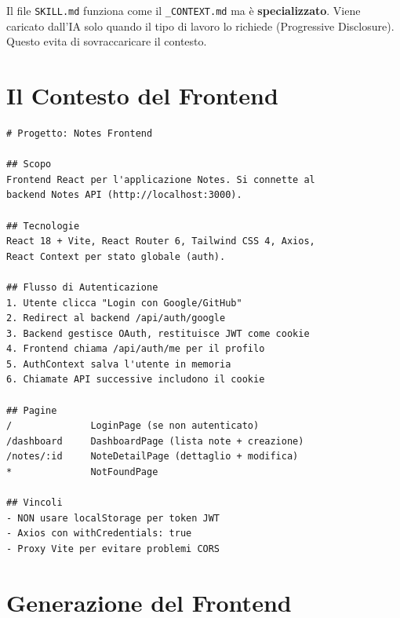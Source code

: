 \begin{notebox}
Il file \texttt{SKILL.md} funziona come il \texttt{\_CONTEXT.md} ma è \textbf{specializzato}. Viene caricato dall'IA solo quando il tipo di lavoro lo richiede (Progressive Disclosure). Questo evita di sovraccaricare il contesto.
\end{notebox}

\section{Il Contesto del Frontend}

\begin{praticabox}[title={Pratica --- Crea \texttt{\_CONTEXT.md} nel frontend}]
\end{praticabox}

\begin{lstlisting}[language={},title={\texttt{\_CONTEXT.md} per Notes Frontend}]
# Progetto: Notes Frontend

## Scopo
Frontend React per l'applicazione Notes. Si connette al
backend Notes API (http://localhost:3000).

## Tecnologie
React 18 + Vite, React Router 6, Tailwind CSS 4, Axios,
React Context per stato globale (auth).

## Flusso di Autenticazione
1. Utente clicca "Login con Google/GitHub"
2. Redirect al backend /api/auth/google
3. Backend gestisce OAuth, restituisce JWT come cookie
4. Frontend chiama /api/auth/me per il profilo
5. AuthContext salva l'utente in memoria
6. Chiamate API successive includono il cookie

## Pagine
/              LoginPage (se non autenticato)
/dashboard     DashboardPage (lista note + creazione)
/notes/:id     NoteDetailPage (dettaglio + modifica)
*              NotFoundPage

## Vincoli
- NON usare localStorage per token JWT
- Axios con withCredentials: true
- Proxy Vite per evitare problemi CORS
\end{lstlisting}

\section{Generazione del Frontend}

